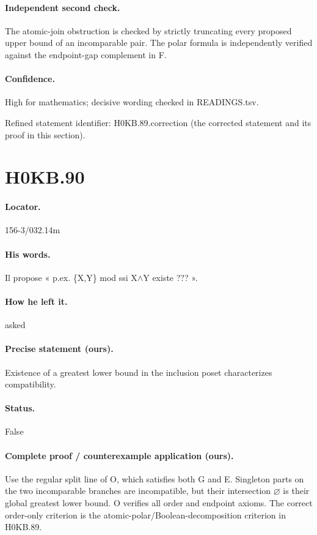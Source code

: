 \paragraph{Independent second check.} The atomic-join obstruction is checked by strictly truncating every proposed upper bound of an incomparable pair. The polar formula is independently verified against the endpoint-gap complement in F.

\paragraph{Confidence.} High for mathematics; decisive wording checked in READINGS.tsv.

\noindent Refined statement identifier: H0KB.89.correction (the corrected statement and its proof in this section).

\section*{H0KB.90}\label{statement:H0KB.90}
\paragraph{Locator.} 156-3/032.14m

\paragraph{His words.} Il propose « p.ex. \{X,Y\} mod ssi X\ensuremath{\wedge}Y existe ??? ».

\paragraph{How he left it.} asked

\paragraph{Precise statement (ours).} Existence of a greatest lower bound in the inclusion poset characterizes compatibility.

\paragraph{Status.} False

\paragraph{Complete proof / counterexample application (ours).} Use the regular split line of O, which satisfies both G and E. Singleton parts on the two incomparable branches are incompatible, but their intersection \ensuremath{\varnothing} is their global greatest lower bound. O verifies all order and endpoint axioms. The correct order-only criterion is the atomic-polar/Boolean-decomposition criterion in H0KB.89.

